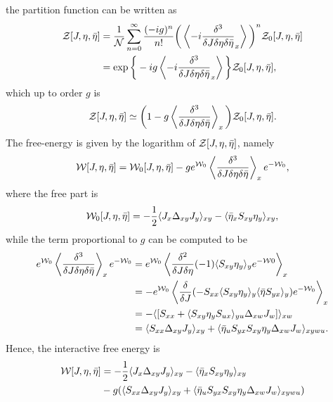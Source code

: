 the partition function can be written as 
\begin{equation}
\label{eq: partition function for Yukawa's theory}
    \begin{split}
        \mathcal{Z}[J,\eta,\bar{\eta}] &= \frac{1}{\mathcal{N}}\sum_{n=0}^\infty\frac{(-ig)^n}{n!}\bigg(\left\langle -i\frac{\delta^3}{\delta J\delta\eta\delta\bar{\eta}}_x \right\rangle\bigg)^n\mathcal{Z}_0[J,\eta,\bar{\eta}] \\
        &= \exp{\bigg\{-ig\left\langle -i\frac{\delta^3}{\delta J\delta\eta\delta\bar{\eta}}_x \right\rangle\bigg\}}\mathcal{Z}_0[J,\eta,\bar{\eta}],
    \end{split}
\end{equation}
which up to order $g$ is 
\begin{equation}
    \mathcal{Z}[J,\eta,\bar{\eta}] \simeq \bigg(1 - g\left\langle \frac{\delta^3}{\delta J\delta\eta\delta\bar{\eta}} \right\rangle_x\bigg)\mathcal{Z}_0[J,\eta,\bar{\eta}].
\end{equation}
The free-energy is given by the logarithm of $\mathcal{Z}[J,\eta,\bar{\eta}]$, namely 
\begin{equation}
    \mathcal{W}[J,\eta,\bar{\eta}] = \mathcal{W}_0[J,\eta,\bar{\eta}] - ge^{\mathcal{W}_0}\left\langle \frac{\delta^3}{\delta J\delta\eta\delta\bar{\eta}} \right\rangle_xe^{-\mathcal{W}_0},
\end{equation}
where the free part is 
\begin{equation}
    \mathcal{W}_0[J,\eta,\bar{\eta}] = -\frac{1}{2}\langle J_x\Delta_{xy}J_y \rangle_{xy} - \langle \bar{\eta}_xS_{xy}\eta_y \rangle_{xy},
\end{equation}
while the term proportional to $g$ can be computed to be 
\begin{equation}
    \begin{split}
        e^{\mathcal{W}_0}\left\langle \frac{\delta^3}{\delta J\delta\eta\delta\bar{\eta}} \right\rangle_xe^{-\mathcal{W}_0} &= e^{\mathcal{W}_0}\left\langle \frac{\delta^2}{\delta J\delta \eta}(-1)\langle S_{xy}\eta_y \rangle_ye^{-\mathcal{W}0} \right\rangle_x \\
        &= -e^{\mathcal{W}_0}\left\langle \frac{\delta}{\delta J}(-S_{xx}\langle S_{xy}\eta_y \rangle_y\langle \bar{\eta}S_{yx} \rangle_y)e^{-\mathcal{W}_0} \right\rangle_x \\
        &= -\langle [S_{xx} + \langle S_{xy}\eta_yS_{ux} \rangle_{yu}\Delta_{xw}J_w] \rangle_{xw} \\
        &= \langle S_{xx}\Delta_{xy}J_y \rangle_{xy} + \langle \bar{\eta}_uS_{yx}S_{xy}\eta_y\Delta_{xw}J_w \rangle_{xywu}.
    \end{split}
\end{equation}
Hence, the interactive free energy is 
\begin{equation}
\label{eq: free energy for Yukawa's theory}
    \begin{split}
        \mathcal{W}[J,\eta,\bar{\eta}] &= -\frac{1}{2}\langle J_x\Delta_{xy}J_y \rangle_{xy} - \langle \bar{\eta}_xS_{xy}\eta_y \rangle_{xy} \\
        &- g(\langle S_{xx}\Delta_{xy}J_y \rangle_{xy} + \langle \bar{\eta}_uS_{yx}S_{xy}\eta_y\Delta_{xw}J_w \rangle_{xywu})
    \end{split}
\end{equation}

